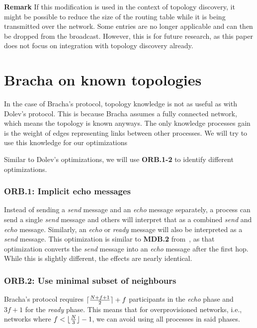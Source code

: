 \textbf{Remark}
If this modification is used in the context of topology discovery, it might be possible to reduce the size of the routing table while it is being transmitted over the network. Some entries are no longer applicable and can then be dropped from the broadcast. However, this is for future research, as this paper does not focus on integration with topology discovery already.

\section{Bracha on known topologies}
\label{contr-bracha}
In the case of Bracha's protocol, topology knowledge is not as useful as with Dolev's protocol. This is because Bracha assumes a fully connected network, which means the topology is known anyways. The only knowledge processes gain is the weight of edges representing links between other processes. We will try to use this knowledge for our optimizations

Similar to Dolev's optimizations, we will use \textbf{ORB.1-2} to identify different optimizations.

\subsubsection{ORB.1: Implicit echo messages}
Instead of sending a \textit{send} message and an \textit{echo} message separately, a process can send a single \textit{send} message and others will interpret that as a combined \textit{send} and \textit{echo} message. Similarly, an \textit{echo} or \textit{ready} message will also be interpreted as a \textit{send} message. This optimization is similar to \textbf{MDB.2} from~\cite{bonomi2021practical}, as that optimization converts the \textit{send} message into an \textit{echo} message after the first hop. While this is slightly different, the effects are nearly identical.


\subsubsection{ORB.2: Use minimal subset of neighbours}
Bracha's protocol requires $\lceil\frac{N+f+1}{2}\rceil + f$ participants in the \textit{echo} phase and $3f+1$ for the \textit{ready} phase. This means that for overprovisioned networks, i.e., networks where $f < \lfloor\frac{N}{3}\rfloor - 1$, we can avoid using all processes in said phases.

